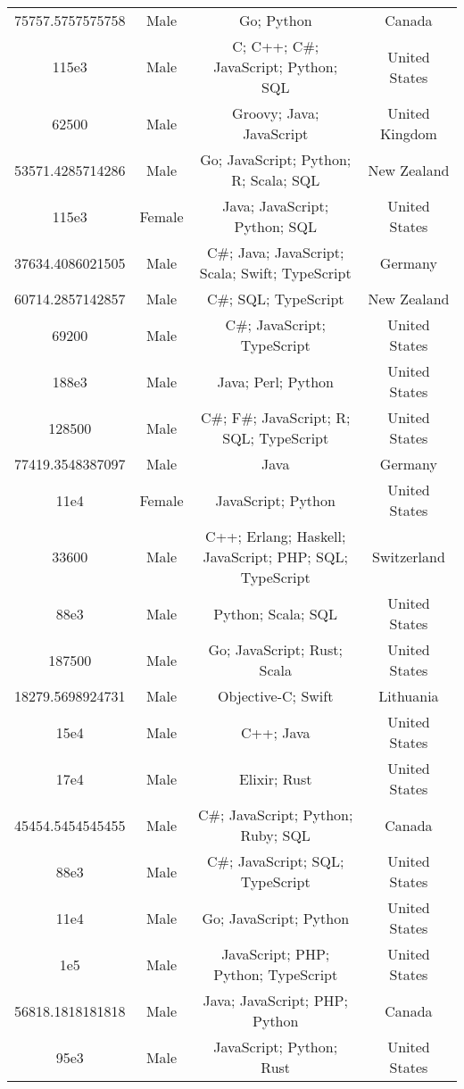 \begin{center}
\begin{tabular}{ |c|c|c|c| }
75757.5757575758  &  Male  &  Go; Python  &  Canada  \\ 
115e3  &  Male  &  C; C++; C\#; JavaScript; Python; SQL  &  United States  \\ 
62500  &  Male  &  Groovy; Java; JavaScript  &  United Kingdom  \\ 
53571.4285714286  &  Male  &  Go; JavaScript; Python; R; Scala; SQL  &  New Zealand  \\ 
115e3  &  Female  &  Java; JavaScript; Python; SQL  &  United States  \\ 
37634.4086021505  &  Male  &  C\#; Java; JavaScript; Scala; Swift; TypeScript  &  Germany  \\ 
60714.2857142857  &  Male  &  C\#; SQL; TypeScript  &  New Zealand  \\ 
69200  &  Male  &  C\#; JavaScript; TypeScript  &  United States  \\ 
188e3  &  Male  &  Java; Perl; Python  &  United States  \\ 
128500  &  Male  &  C\#; F\#; JavaScript; R; SQL; TypeScript  &  United States  \\ 
77419.3548387097  &  Male  &  Java  &  Germany  \\ 
11e4  &  Female  &  JavaScript; Python  &  United States  \\ 
33600  &  Male  &  C++; Erlang; Haskell; JavaScript; PHP; SQL; TypeScript  &  Switzerland  \\ 
88e3  &  Male  &  Python; Scala; SQL  &  United States  \\ 
187500  &  Male  &  Go; JavaScript; Rust; Scala  &  United States  \\ 
18279.5698924731  &  Male  &  Objective-C; Swift  &  Lithuania  \\ 
15e4  &  Male  &  C++; Java  &  United States  \\ 
17e4  &  Male  &  Elixir; Rust  &  United States  \\ 
45454.5454545455  &  Male  &  C\#; JavaScript; Python; Ruby; SQL  &  Canada  \\ 
88e3  &  Male  &  C\#; JavaScript; SQL; TypeScript  &  United States  \\ 
11e4  &  Male  &  Go; JavaScript; Python  &  United States  \\ 
1e5  &  Male  &  JavaScript; PHP; Python; TypeScript  &  United States  \\ 
56818.1818181818  &  Male  &  Java; JavaScript; PHP; Python  &  Canada  \\ 
95e3  &  Male  &  JavaScript; Python; Rust  &  United States  \\ 

\end{tabular}
\end{center}
